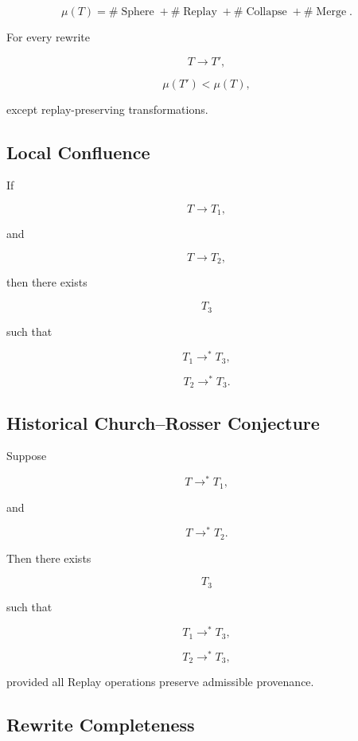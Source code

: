 \documentclass[12pt,oneside]{article}
\theoremstyle{definition}
\theoremstyle{remark}
\begin{document}
\[
\mu(T)
=
\#\operatorname{Sphere}
+
\#\operatorname{Replay}
+
\#\operatorname{Collapse}
+
\#\operatorname{Merge}.
\]

For every rewrite

\[
T
\rightarrow
T',
\]

\[
\mu(T')
<
\mu(T),
\]

except replay-preserving transformations.

\subsection*{Local Confluence}

If

\[
T
\rightarrow
T_1,
\]

and

\[
T
\rightarrow
T_2,
\]

then there exists

\[
T_3
\]

such that

\[
T_1
\rightarrow^{*}
T_3,
\]

\[
T_2
\rightarrow^{*}
T_3.
\]

\subsection*{Historical Church--Rosser Conjecture}

Suppose

\[
T
\rightarrow^{*}
T_1,
\]

and

\[
T
\rightarrow^{*}
T_2.
\]

Then there exists

\[
T_3
\]

such that

\[
T_1
\rightarrow^{*}
T_3,
\]

\[
T_2
\rightarrow^{*}
T_3,
\]

provided all Replay operations preserve admissible provenance.

\subsection*{Rewrite Completeness}
\end{document}
